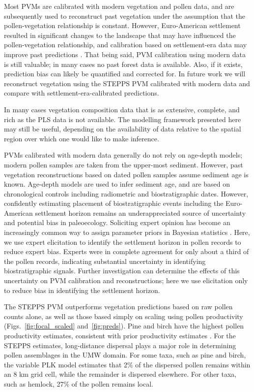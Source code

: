 \documentclass[12pt]{article}
\begin{document}
Most PVMs are calibrated with modern vegetation and pollen data, and
are subsequently used to reconstruct past vegetation under the
assumption that the pollen-vegetation relationship is
constant. However, Euro-American settlement resulted in significant
changes to the landscape that may have influenced the
pollen-vegetation relationship, and calibration based on
settlement-era data may improve past predictions \citep{kujawa2015,
  st2014bias}. That being said, PVM calibration using modern data is
still valuable; in many cases no past forest data is available.  Also,
if it exists, prediction bias can likely be quantified and corrected
for. In future work we will reconstruct vegetation using the STEPPS
PVM calibrated with modern data and compare with
settlement-era-calibrated predictions.

In many cases vegetation composition data that is as extensive,
complete, and rich as the PLS data is not available. The modelling
framework presented here may still be useful, depending on the
availability of data relative to the spatial region over which one
would like to make inference.

PVMs calibrated with modern data generally do not rely on age-depth
models; modern pollen samples are taken from the upper-most
sediment. However, past vegetation reconstructions based on dated
pollen samples assume sediment age is known. Age-depth models are used
to infer sediment age, and are based on chronological controls
including radiometric and biostratigraphic dates. However, confidently
estimating placement of biostratigraphic events including the
Euro-American settlement horizon remains an underappreciated source of
uncertainty and potential bias in paleoecology. Soliciting expert
opinion has become an increasingly common way to assign parameter
priors in Bayesian statistics \citep{choy2009elicitation}. Here, we
use expert elicitation to identify the settlement horizon in pollen
records to reduce expert bias. Experts were in complete agreement for
only about a third of the pollen records, indicating substantial
uncertainty in identifying biostratigraphic signals. Further
investigation can determine the effects of this uncertainty on PVM
calibration and reconstructions; here we use elicitation only to
reduce bias in identifying the settlement horizon.

The STEPPS PVM outperforms vegetation predictions based on raw pollen
counts alone, as well as those based simply on scaling using pollen
productivity (Figs.~\ref{fig:focal_scaled} and~\ref{fig:preds}). Pine
and birch have the highest pollen productivity estimates, consistent
with prior productivity estimates \citep{bradshaw1985relationships,
  prentice1986}. For the STEPPS estimates, long-distance dispersal
plays a major role in determining pollen assemblages in the UMW
domain. For some taxa, such as pine and birch, the variable PLK model
estimates that 2\% of the dispersed pollen remains within an 8 km grid
cell, while the remainder is dispersed elsewhere. For other taxa, such
as hemlock, 27\% of the pollen remains local.
\end{document}
